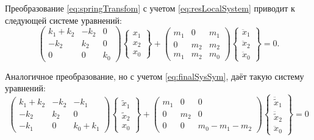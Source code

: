 Преобразование \eqref{eq:springTransfom} с учетом \eqref{eq:resLocalSystem} приводит к следующей системе уравнений:
\begin{equation}
	\begin{pmatrix}
		k_1+k_2 & -k_2 & 0 \\
		-k_2 & k_2 & 0 \\
		0 & 0 & k_0
	\end{pmatrix}
	\begin{Bmatrix}
		x_1 \\ x_2 \\ x_0
	\end{Bmatrix} +
	\begin{pmatrix}
		m_1 & 0 & m_1 \\
		0 & m_2 & m_2 \\
		m_1 & m_2 & m_0
	\end{pmatrix}
	\begin{Bmatrix}
		\ddot{x}_1 \\ \ddot{x}_2 \\ \ddot{x}_0
	\end{Bmatrix} = 0.
	\label{eq:springASymSys}
\end{equation}

Аналогичное преобразование, но с учетом \eqref{eq:finalSysSym}, даёт такую систему уравнений:
\begin{equation}
	\begin{pmatrix}
		k_1+k_2 & -k_2 & -k_1 \\
		-k_2 & k_2 & 0 \\
		-k_1 & 0 & k_0+k_1
	\end{pmatrix}
	\begin{Bmatrix}
		\tilde{x}_1 \\ \tilde{x}_2 \\ x_0
	\end{Bmatrix} +
	\begin{pmatrix}
		m_1 & 0 & 0 \\
		0 & m_2 & 0 \\
		0 & 0 & m_0 - m_1 - m_2
	\end{pmatrix}
	\begin{Bmatrix}
		\ddot{\tilde{x}}_1 \\ \ddot{\tilde{x}}_2 \\ \ddot{x}_0
	\end{Bmatrix} = 0
	\label{eq:springSymSys}
\end{equation}

